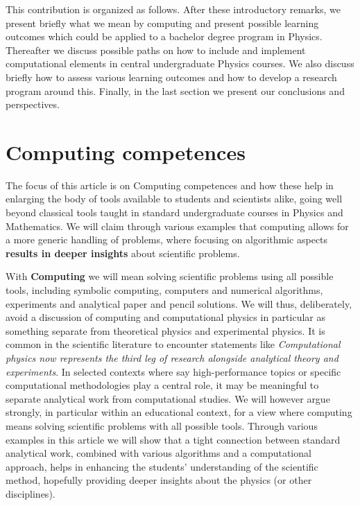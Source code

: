 \documentclass[graybox,envcountchap,sectrefs]{svmult}
\begin{document}
This contribution is organized as follows. After these introductory
remarks, we present briefly what we mean by computing and present
possible learning outcomes which could be applied to a bachelor degree
program in Physics.  Thereafter we discuss possible paths on how to include and implement 
computational elements in central undergraduate Physics courses. We also discuss briefly
how to assess various learning outcomes and how to develop a research program around this. 
Finally, in the last section we present our conclusions and perspectives.


\section{Computing competences}

The focus of this article is on Computing competences and how
these help in enlarging the body of tools available to students and
scientists alike, going well beyond classical tools taught in standard
undergraduate courses in Physics and Mathematics. We will claim through various
examples that computing allows for a more generic handling of
problems, where focusing on algorithmic aspects \textbf{results in deeper
insights} about scientific problems.

With \textbf{Computing} we will mean solving scientific problems using all
possible tools, including symbolic computing, computers and numerical
algorithms, experiments and analytical paper and pencil solutions. We
will thus, deliberately, avoid a discussion of computing and
computational physics in particular as something separate from
theoretical physics and experimental physics.  It is common in the
scientific literature to encounter statements like \emph{Computational
physics now represents the third leg of research alongside analytical
theory and experiments}. In selected contexts where say
high-performance topics or specific computational methodologies play a
central role, it may be meaningful to separate analytical work from
computational studies. We will however argue strongly, in particular within an educational context,  
for a view where
computing means solving scientific problems with all possible
tools. Through various examples in this article we will show that a
tight connection between standard analytical work, combined with
various algorithms and a computational approach, helps in enhancing the
students' understanding of the scientific method, hopefully providing
deeper insights about the physics (or other disciplines).
\end{document}
